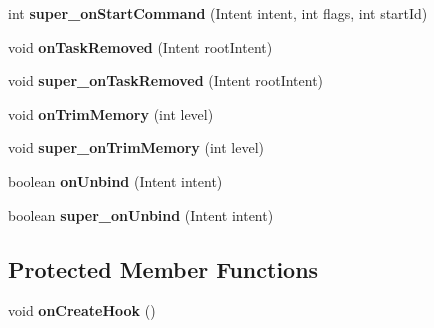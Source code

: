 \begin{DoxyCompactItemize}
\mbox{\label{classorg_1_1qtproject_1_1qt5_1_1android_1_1bindings_1_1_qt_service_a97a1287ac2fa45d8d6ada5671affb09e}} 
int {\bfseries super\+\_\+on\+Start\+Command} (Intent intent, int flags, int start\+Id)
\item 
\mbox{\label{classorg_1_1qtproject_1_1qt5_1_1android_1_1bindings_1_1_qt_service_af209a344b0e11b2d3dbdf17451f9dc5f}} 
void {\bfseries on\+Task\+Removed} (Intent root\+Intent)
\item 
\mbox{\label{classorg_1_1qtproject_1_1qt5_1_1android_1_1bindings_1_1_qt_service_a8eb8a1084b16e8ab82b6b81da997a7e8}} 
void {\bfseries super\+\_\+on\+Task\+Removed} (Intent root\+Intent)
\item 
\mbox{\label{classorg_1_1qtproject_1_1qt5_1_1android_1_1bindings_1_1_qt_service_abc58b2db54e7abd226393598273ae1e0}} 
void {\bfseries on\+Trim\+Memory} (int level)
\item 
\mbox{\label{classorg_1_1qtproject_1_1qt5_1_1android_1_1bindings_1_1_qt_service_ac05fde1869bf4b4799dc0e3a64e966dc}} 
void {\bfseries super\+\_\+on\+Trim\+Memory} (int level)
\item 
\mbox{\label{classorg_1_1qtproject_1_1qt5_1_1android_1_1bindings_1_1_qt_service_a81364124403ac48ae807ef4f4e33c22d}} 
boolean {\bfseries on\+Unbind} (Intent intent)
\item 
\mbox{\label{classorg_1_1qtproject_1_1qt5_1_1android_1_1bindings_1_1_qt_service_a85c1a07e931243687bf02d5a12c957f4}} 
boolean {\bfseries super\+\_\+on\+Unbind} (Intent intent)
\end{DoxyCompactItemize}
\subsection*{Protected Member Functions}
\begin{DoxyCompactItemize}
\item 
\mbox{\label{classorg_1_1qtproject_1_1qt5_1_1android_1_1bindings_1_1_qt_service_ad7068b634b64404942e789af91ae87ae}} 
void {\bfseries on\+Create\+Hook} ()
\end{DoxyCompactItemize}


